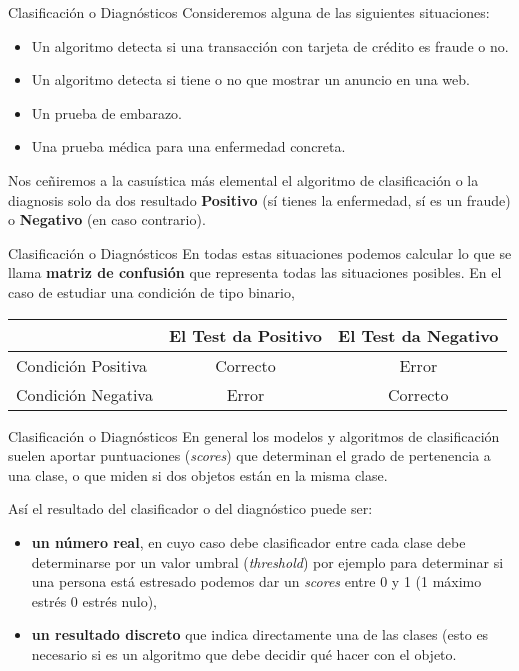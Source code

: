 \documentclass[
  ignorenonframetext,
]{beamer}
\providecommand{\tightlist}{%
  \setlength{\itemsep}{0pt}\setlength{\parskip}{0pt}}
\begin{document}
\begin{frame}{Clasificación o Diagnósticos}
\protect\hypertarget{clasificaciuxf3n-o-diagnuxf3sticos}{}
Consideremos alguna de las siguientes situaciones:

\begin{itemize}
\tightlist
\item
  Un algoritmo detecta si una transacción con tarjeta de crédito es
  fraude o no.
\item
  Un algoritmo detecta si tiene o no que mostrar un anuncio en una web.
\item
  Un prueba de embarazo.
\item
  Una prueba médica para una enfermedad concreta.
\end{itemize}

Nos ceñiremos a la casuística más elemental el algoritmo de
clasificación o la diagnosis solo da dos resultado \textbf{Positivo} (sí
tienes la enfermedad, sí es un fraude) o \textbf{Negativo} (en caso
contrario).
\end{frame}

\begin{frame}{Clasificación o Diagnósticos}
\protect\hypertarget{clasificaciuxf3n-o-diagnuxf3sticos-1}{}
En todas estas situaciones podemos calcular lo que se llama
\textbf{matriz de confusión} que representa todas las situaciones
posibles. En el caso de estudiar una condición de tipo binario,

\begin{longtable}[]{@{}lcc@{}}
\toprule
& El Test da Positivo & El Test da Negativo\tabularnewline
\midrule
\endhead
Condición Positiva & Correcto & Error\tabularnewline
Condición Negativa & Error & Correcto\tabularnewline
\bottomrule
\end{longtable}
\end{frame}

\begin{frame}{Clasificación o Diagnósticos}
\protect\hypertarget{clasificaciuxf3n-o-diagnuxf3sticos-2}{}
En general los modelos y algoritmos de clasificación suelen aportar
puntuaciones (\emph{scores}) que determinan el grado de pertenencia a
una clase, o que miden si dos objetos están en la misma clase.

Así el resultado del clasificador o del diagnóstico puede ser:

\begin{itemize}
\tightlist
\item
  \textbf{un número real}, en cuyo caso debe clasificador entre cada
  clase debe determinarse por un valor umbral (\emph{threshold}) por
  ejemplo para determinar si una persona está estresado podemos dar un
  \emph{scores} entre 0 y 1 (1 máximo estrés 0 estrés nulo),
\item
  \textbf{un resultado discreto} que indica directamente una de las
  clases (esto es necesario si es un algoritmo que debe decidir qué
  hacer con el objeto.
\end{itemize}
\end{frame}
\end{document}
